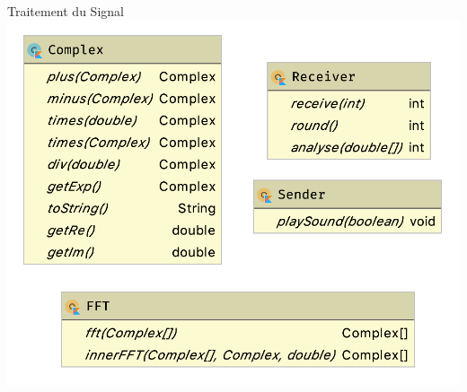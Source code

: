 \documentclass[aspectratio=169]{beamer}
\begin{document}
\begin{frame}{Traitement du Signal}
  \centering
  \includegraphics[height=.9\textheight]{../assets/uml_signal}
\end{frame}
\end{document}
